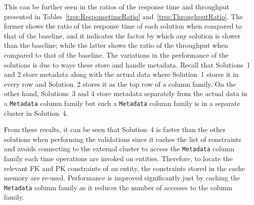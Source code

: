 This can be further seen in the ratios of the response time and throughput
presented in Tables~\ref{tres:ResponsetimeRatio} and~\ref{tres:ThroughputRatio}. 
The former shows the ratio of the response time of each solution when compared
to that of the baseline,  and it indicates the factor by which any solution is
slower than the baseline;  while
the latter shows the ratio of the throughput when compared to that of the
baseline. 
The variations in the performance of the solutions is due to ways these store
and handle metadata.  Recall that Solutions~1 and 2 store metadata along with the
actual data where Solution~1 stores it in every row and Solution~2 stores it as
the top row of a column family.  On the other hand,  Solutions~3 and 4 store
metadata separately from the actual data  in a \texttt{Metadata} column family
but such a  \texttt{Metadata} column family is in a separate cluster in
Solution~4. 

From these results,  it can be seen that Solution~4  is faster than the other
solutions when performing the validations  since it caches the list of
constraints and avoids connecting to the external cluster to access the
\texttt{Metadata} column family each time  operations are invoked on entities. 
Therefore,  to locate the relevant \ac{FK} and \ac{PK} constraints of an entity, 
the constraints stored in the cache memory are re-used. 
Performance is improved significantly just by caching the 
\texttt{Metadata} column family as it reduces the number of accesses to the
column family. 


